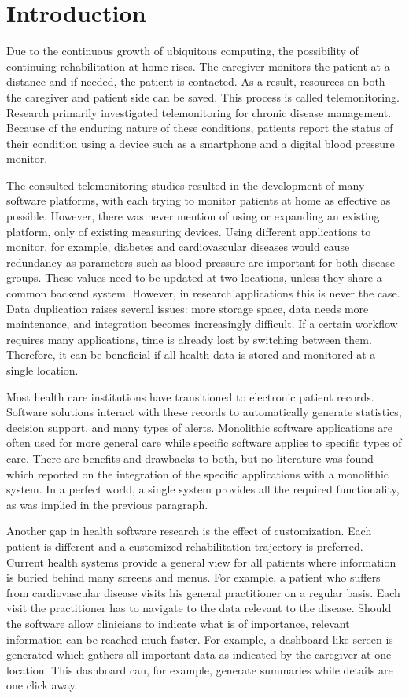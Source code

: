 \section{Introduction}

Due to the continuous growth of ubiquitous computing, the possibility of continuing rehabilitation at home rises. The caregiver monitors the patient at a distance and if needed, the patient is contacted. As a result, resources on both the caregiver and patient side can be saved. This process is called telemonitoring. Research primarily investigated telemonitoring for chronic disease management. Because of the enduring nature of these conditions, patients report the status of their condition using a device such as a smartphone and a digital blood pressure monitor.

The consulted telemonitoring studies resulted in the development of many software platforms, with each trying to monitor patients at home as effective as possible. However, there was never mention of using or expanding an existing platform, only of existing measuring devices. Using different applications to monitor, for example, diabetes and cardiovascular diseases would cause redundancy as parameters such as blood pressure are important for both disease groups. These values need to be updated at two locations, unless they share a common backend system. However, in research applications this is never the case. Data duplication raises several issues: more storage space, data needs more maintenance, and integration becomes increasingly difficult. If a certain workflow requires many applications, time is already lost by switching between them. Therefore, it can be beneficial if all health data is stored and monitored at a single location.

Most health care institutions have transitioned to electronic patient records. Software solutions interact with these records to automatically generate statistics, decision support, and many types of alerts. Monolithic software applications are often used for more general care while specific software applies to specific types of care. There are benefits and drawbacks to both, but no literature was found which reported on the integration of the specific applications with a monolithic system. In a perfect world, a single system provides all the required functionality, as was implied in the previous paragraph.

Another gap in health software research is the effect of customization. Each patient is different and a customized rehabilitation trajectory is preferred. Current health systems provide a general view for all patients where information is buried behind many screens and menus. For example, a patient who suffers from cardiovascular disease visits his general practitioner on a regular basis. Each visit the practitioner has to navigate to the data relevant to the disease. Should the software allow clinicians to indicate what is of importance, relevant information can be reached much faster. For example, a dashboard-like screen is generated which gathers all important data as indicated by the caregiver at one location. This dashboard can, for example, generate summaries while details are one click away. 

